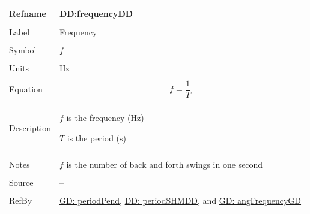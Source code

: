 \documentclass[12pt]{article}
\begin{document}
\vspace{\baselineskip}
\noindent
\begin{minipage}{\textwidth}
\begin{tabular}{>{\raggedright}p{}>{\raggedright\arraybackslash}p{}}
\toprule \textbf{Refname} & \textbf{DD:frequencyDD}
\label{DD:frequencyDD}
\\ \midrule \\
Label & Frequency
        
\\ \midrule \\
Symbol & $f$
         
\\ \midrule \\
Units & ${\text{Hz}}$
        
\\ \midrule \\
Equation & \begin{displaymath}
           f=\frac{1}{T}
           \end{displaymath}
\\ \midrule \\
Description & \begin{symbDescription}
              \item{$f$ is the frequency (${\text{Hz}}$)}
              \item{$T$ is the period (${\text{s}}$)}
              \end{symbDescription}
\\ \midrule \\
Notes & $f$ is the number of back and forth swings in one second
        
\\ \midrule \\
Source & --
         
\\ \midrule \\
RefBy & \hyperref[GD:periodPend]{GD: periodPend}, \hyperref[DD:periodSHMDD]{DD: periodSHMDD}, and \hyperref[GD:angFrequencyGD]{GD: angFrequencyGD}
        
\\ \bottomrule
\end{tabular}
\end{minipage}
\end{document}
